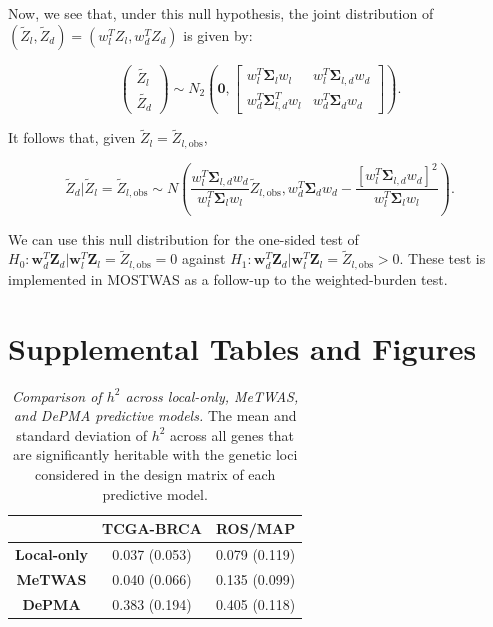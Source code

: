 \documentclass[11pt]{article}
\begin{document}
Now, we see that, under this null hypothesis,
the joint distribution of 
$(\tilde{Z}_l,\tilde{Z}_d) =
(w_l^TZ_l,w_d^TZ_d)$
is given by:

$$\begin{pmatrix}
\tilde{Z_l}  \\
\tilde{Z_d}
\end{pmatrix} \sim N_2\left(\textbf{0},
\begin{bmatrix}
w_l^T\mathbf{\Sigma}_{l}w_l & w_l^T\mathbf{\Sigma}_{l,d}w_d \\
w_d^T\mathbf{\Sigma}_{l,d}^Tw_l & w_d^T\mathbf{\Sigma}_{d}w_d
\end{bmatrix}
\right).$$

It follows that, given 
$\tilde{Z}_l = \tilde{Z}_{l,\text{obs}}$,

$$\tilde{Z}_d | \tilde{Z}_l = \tilde{Z}_{l,\text{obs}} \sim N\left(\frac{w_l^T\mathbf{\Sigma}_{l,d}w_d}{w_l^T\mathbf{\Sigma}_{l}w_l}\tilde{Z}_{l,\text{obs}},w_d^T\mathbf{\Sigma}_{d}w_d - \frac{[w_l^T\mathbf{\Sigma}_{l,d}w_d]^2}{w_l^T\mathbf{\Sigma}_{l}w_l}\right).$$

We can use this null distribution for
the one-sided test of
$H_0: \mathbf{w}_d^T\mathbf{Z}_d | \mathbf{w}_l^T\mathbf{Z}_l = \tilde{Z}_{l,\text{obs}} = 0$
against
$H_1: \mathbf{w}_d^T\mathbf{Z}_d | \mathbf{w}_l^T\mathbf{Z}_l = \tilde{Z}_{l,\text{obs}} > 0$. These test
is implemented in MOSTWAS as a follow-up
to the weighted-burden test.

\pagebreak

\section{Supplemental Tables and Figures}


\begin{table}[!h]
\centering
\begin{tabular}{@{}ccc@{}}
\multicolumn{1}{l}{} & \textbf{TCGA-BRCA} & \textbf{ROS/MAP} \\ \midrule
\textbf{Local-only} & 0.037 (0.053) & 0.079 (0.119) \\
\textbf{MeTWAS} & 0.040 (0.066) & 0.135 (0.099) \\
\textbf{DePMA} & 0.383 (0.194) & 0.405 (0.118) \\ \bottomrule
\end{tabular}
\caption{\emph{Comparison of $h^2$
across local-only,
MeTWAS, and DePMA predictive models.}
The mean and standard deviation of $h^2$
across all genes that are significantly
heritable with the genetic loci
considered in the design matrix
of each predictive model.}
\label{tbl:ch4_supptab1}
\end{table}
\end{document}
